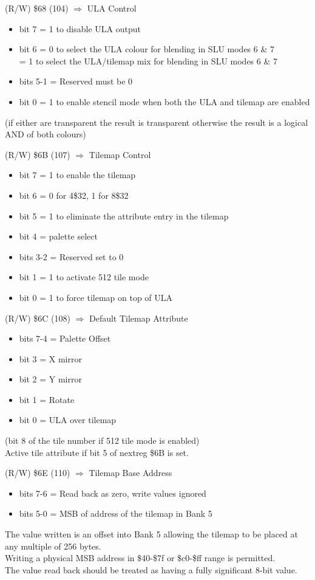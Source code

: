 (R/W) \$68 (104) $\Rightarrow$ ULA Control
\begin{itemize}
\item[] bit 7 = 1 to disable ULA output
\item[] bit 6 = 0 to select the ULA colour for blending in SLU modes 6
  \& 7\\
  = 1 to select the ULA/tilemap mix for blending in SLU modes 6 \& 7
\item[] bits 5-1 = Reserved must be 0
\item[] bit 0 = 1 to enable stencil mode when both the ULA and tilemap are enabled
\end{itemize}
(if either are transparent the result is transparent otherwise the
result is a logical AND of both colours)

(R/W) \$6B (107) $\Rightarrow$ Tilemap Control
\begin{itemize}
\item[] bit 7 = 1 to enable the tilemap
\item[] bit 6 = 0 for 4\$32, 1 for 8\$32
\item[] bit 5 = 1 to eliminate the attribute entry in the tilemap
\item[] bit 4 = palette select
\item[] bits 3-2 = Reserved set to 0
\item[] bit 1 = 1 to activate 512 tile mode
\item[] bit 0 = 1 to force tilemap on top of ULA
\end{itemize}

(R/W) \$6C (108) $\Rightarrow$ Default Tilemap Attribute
\begin{itemize}
\item[] bits 7-4 = Palette Offset
\item[] bit 3 = X mirror
\item[] bit 2 = Y mirror
\item[] bit 1 = Rotate
\item[] bit 0 = ULA over tilemap
\end{itemize}
(bit 8 of the tile number if 512 tile mode is enabled)\\
Active tile attribute if bit 5 of nextreg \$6B is set.

(R/W) \$6E (110) $\Rightarrow$ Tilemap Base Address
\begin{itemize}
\item[] bits 7-6 = Read back as zero, write values ignored
\item[] bits 5-0 = MSB of address of the tilemap in Bank 5
\end{itemize}
The value written is an offset into Bank 5 allowing the tilemap to be
placed at any multiple of 256 bytes.\\
Writing a physical MSB address in \$40-\$7f or \$c0-\$ff range is
permitted.\\
The value read back should be treated as having a fully significant
8-bit value.

